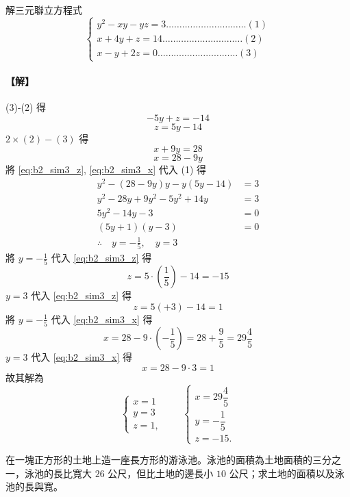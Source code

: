 \begin{example}\label{ex:b2_1-4-6}
解三元聯立方程式
\[
\begin{cases}
y^2-xy-yz=3 \dots\dots\dots\dots\dots\dots\dots\dots\dots\dots (1) \\
x+4y+z=14 \dots\dots\dots\dots\dots\dots\dots\dots\dots\dots (2) \\
x-y+2z=0 \dots\dots\dots\dots\dots\dots\dots\dots\dots\dots (3)
\end{cases}
\]
\end{example}
\paragraph{【解】}
(3)-(2) 得
\[
-5y+z=-14
\]
\begin{equation}\label{eq:b2_sim3_z}\tag{4}
z=5y-14
\end{equation}
$2 \times (2) - (3)$ 得
\[
x+9y=28
\]
\begin{equation}\label{eq:b2_sim3_x}\tag{5}
x=28-9y
\end{equation}
將 \eqref{eq:b2_sim3_z}, \eqref{eq:b2_sim3_x} 代入 (1) 得
\begin{align*}
y^2-(28-9y)y-y(5y-14) &= 3 \\
y^2-28y+9y^2-5y^2+14y &= 3 \\
5y^2-14y-3 &= 0 \\
(5y+1)(y-3) &= 0 \\
\therefore\quad y=-\frac{1}{5},\quad y=3
\end{align*}
將 $y=-\frac{1}{5}$ 代入 \eqref{eq:b2_sim3_z} 得\label{note:b2-ch1-ex6-sign}
\[
z=5\cdot\left(\frac{1}{5}\right)-14=-15
\]
$y=3$ 代入 \eqref{eq:b2_sim3_z} 得
\[
z=5(+3)-14=1
\]
將 $y=-\frac{1}{5}$ 代入 \eqref{eq:b2_sim3_x} 得
\[
x=28-9\cdot\left(-\frac{1}{5}\right) = 28+\frac{9}{5} = 29\frac{4}{5}
\]
$y=3$ 代入 \eqref{eq:b2_sim3_x} 得
\[
x = 28-9\cdot 3 = 1
\]
故其解為
\[
\begin{cases}
x=1 \\
y=3 \\
z=1,
\end{cases}\qquad
\begin{cases}
x=29\dfrac{4}{5} \\
y=-\dfrac{1}{5} \\
z=-15.
\end{cases}
\]


\begin{example}\label{ex:b2_1-4-7}
在一塊正方形的土地上造一座長方形的游泳池。泳池的面積為土地面積的三分之一，泳池的長比寬大 $26$ 公尺，但比土地的邊長小 $10$ 公尺；求土地的面積以及泳池的長與寬。
\end{example}
